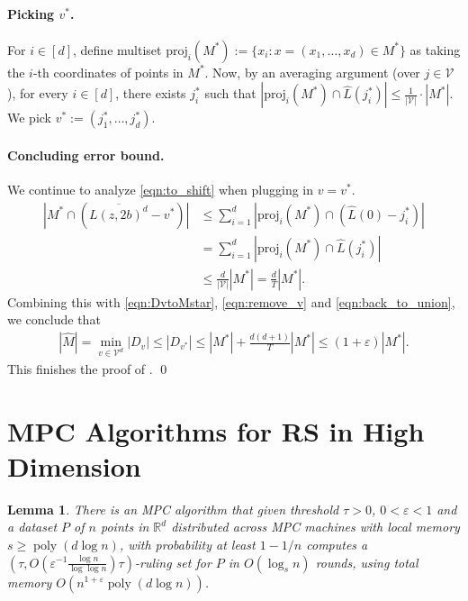 \documentclass[11pt,letterpaper]{article}
\theoremstyle{plain}
\newtheorem{lemma}[theorem]{Lemma}
\theoremstyle{definition}
\theoremstyle{remark}
\DeclareMathOperator{\poly}{poly}
\newcommand{\proj}{\ensuremath{\mathrm{proj}}\xspace}
\renewcommand{\epsilon}{\ensuremath{\varepsilon}}
\let\epsilon\varepsilon
\begin{document}
\paragraph{Picking $v^*$.}
For $i \in [d]$, define multiset $\proj_i(M^*) := \{ x_i : x = (x_1, \ldots, x_d) \in M^* \}$ as taking the $i$-th coordinates of points in $M^*$.
Now, by an averaging argument (over $j \in \mathcal{V}$),
for every $i \in [d]$, there exists $j_i^*$ such that 
$ |\proj_i(M^*) \cap \hat{L}(j_i^*)| \leq \frac{1}{|\mathcal{V}|} \cdot |M^*| $.
We pick $v^* := (j_1^*, \ldots, j_d^*)$.

\paragraph{Concluding error bound.}
We continue to analyze \eqref{eqn:to_shift} when plugging in $v = v^*$.
\begin{align*}
    |M^* \cap (\overline{L(z, 2b)^d} - v^*)|
    &\leq \sum_{i = 1}^d |\proj_i(M^*) \cap (\hat{L}(0) - j_i^*)| \\
    &= \sum_{i = 1}^d |\proj_i(M^*) \cap \hat{L}(j_i^*)| \\
    &\leq \frac{d}{|\mathcal{V}|} |M^*|
    = \frac{d}{T} |M^*|.
\end{align*}
Combining this with \eqref{eqn:DvtoMstar}, \eqref{eqn:remove_v} and \eqref{eqn:back_to_union},
we conclude that
\begin{align*}
    |\widehat{M}| = \min_{v \in \mathcal{V}^d} |D_v|
    \leq |D_{v^*}| \leq |M^*| + \frac{d(d + 1)}{T} |M^*|
    \leq (1 + \epsilon) |M^*|.
\end{align*}
This finishes the proof of .
\qed














     \section{MPC Algorithms for RS in High Dimension}
\label{sec:ruling_set}



\begin{lemma}
    \label{thm:ruling_set}
    There is an MPC algorithm that given threshold $\tau>0$,  $0<\varepsilon<1$ and a dataset $P$ of $n$ points in $\mathbb{R}^{d}$ distributed across MPC machines with local memory $s\geq \poly(d\log n)$, with probability at least $1-1/n$ computes a $(\tau, O(\varepsilon^{-1}\frac{\log n}{\log\log n})\tau)$-ruling set for $P$ in $O(\log_{s} n)$ rounds, using total memory $O(n^{1+\varepsilon}\poly(d\log n))$.    
\end{lemma}
\end{document}
